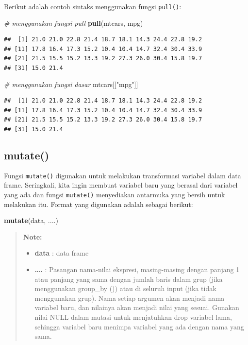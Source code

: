 \documentclass[]{book}
\newenvironment{Shaded}{\begin{snugshade}}{\end{snugshade}}
\newcommand{\KeywordTok}[1]{\textcolor[rgb]{0.13,0.29,0.53}{\textbf{#1}}}
\newcommand{\StringTok}[1]{\textcolor[rgb]{0.31,0.60,0.02}{#1}}
\newcommand{\CommentTok}[1]{\textcolor[rgb]{0.56,0.35,0.01}{\textit{#1}}}
\newcommand{\NormalTok}[1]{#1}
\providecommand{\tightlist}{%
  \setlength{\itemsep}{0pt}\setlength{\parskip}{0pt}}
\begin{document}
Berikut adalah contoh sintaks menggunakan fungsi \texttt{pull()}:

\begin{Shaded}
\begin{Highlighting}[]
\CommentTok{# menggunakan fungsi pull}
\KeywordTok{pull}\NormalTok{(mtcars, mpg)}
\end{Highlighting}
\end{Shaded}

\begin{verbatim}
##  [1] 21.0 21.0 22.8 21.4 18.7 18.1 14.3 24.4 22.8 19.2
## [11] 17.8 16.4 17.3 15.2 10.4 10.4 14.7 32.4 30.4 33.9
## [21] 21.5 15.5 15.2 13.3 19.2 27.3 26.0 30.4 15.8 19.7
## [31] 15.0 21.4
\end{verbatim}

\begin{Shaded}
\begin{Highlighting}[]
\CommentTok{# menggunakan fungsi dasar}
\NormalTok{mtcars[[}\StringTok{"mpg"}\NormalTok{]]}
\end{Highlighting}
\end{Shaded}

\begin{verbatim}
##  [1] 21.0 21.0 22.8 21.4 18.7 18.1 14.3 24.4 22.8 19.2
## [11] 17.8 16.4 17.3 15.2 10.4 10.4 14.7 32.4 30.4 33.9
## [21] 21.5 15.5 15.2 13.3 19.2 27.3 26.0 30.4 15.8 19.7
## [31] 15.0 21.4
\end{verbatim}

\subsection{mutate()}\label{mutate}

Fungsi \texttt{mutate()} digunakan untuk melakukan transformasi variabel
dalam data frame. Seringkali, kita ingin membuat variabel baru yang
berasal dari variabel yang ada dan fungsi \texttt{mutate()} menyediakan
antarmuka yang bersih untuk melakukan itu. Format yang digunakan adalah
sebagai berikut:

\begin{Shaded}
\begin{Highlighting}[]
\KeywordTok{mutate}\NormalTok{(data, ....)}
\end{Highlighting}
\end{Shaded}

\begin{quote}
\textbf{Note: }

\begin{itemize}
\tightlist
\item
  \textbf{data} : data frame
\item
  \textbf{\ldots{}.} : Pasangan nama-nilai ekspresi, masing-masing
  dengan panjang 1 atau panjang yang sama dengan jumlah baris dalam grup
  (jika menggunakan group\_by ()) atau di seluruh input (jika tidak
  menggunakan grup). Nama setiap argumen akan menjadi nama variabel
  baru, dan nilainya akan menjadi nilai yang sesuai. Gunakan nilai NULL
  dalam mutasi untuk menjatuhkan drop variabel lama, sehingga variabel
  baru menimpa variabel yang ada dengan nama yang sama.
\end{itemize}
\end{quote}
\end{document}
